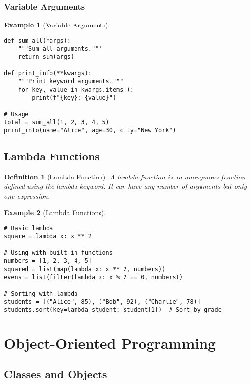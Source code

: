 \documentclass[11pt]{article}
\newtheorem{definition}{Definition}[section]
\newtheorem{example}{Example}[section]
\begin{document}
\subsubsection{Variable Arguments}

\begin{example}[Variable Arguments]
\begin{lstlisting}
def sum_all(*args):
    """Sum all arguments."""
    return sum(args)

def print_info(**kwargs):
    """Print keyword arguments."""
    for key, value in kwargs.items():
        print(f"{key}: {value}")

# Usage
total = sum_all(1, 2, 3, 4, 5)
print_info(name="Alice", age=30, city="New York")
\end{lstlisting}
\end{example}

\subsection{Lambda Functions}

\begin{definition}[Lambda Function]
A lambda function is an anonymous function defined using the lambda keyword. It can have any number of arguments but only one expression.
\end{definition}

\begin{example}[Lambda Functions]
\begin{lstlisting}
# Basic lambda
square = lambda x: x ** 2

# Using with built-in functions
numbers = [1, 2, 3, 4, 5]
squared = list(map(lambda x: x ** 2, numbers))
evens = list(filter(lambda x: x % 2 == 0, numbers))

# Sorting with lambda
students = [("Alice", 85), ("Bob", 92), ("Charlie", 78)]
students.sort(key=lambda student: student[1])  # Sort by grade
\end{lstlisting}
\end{example}

\section{Object-Oriented Programming}

\subsection{Classes and Objects}
\end{document}
